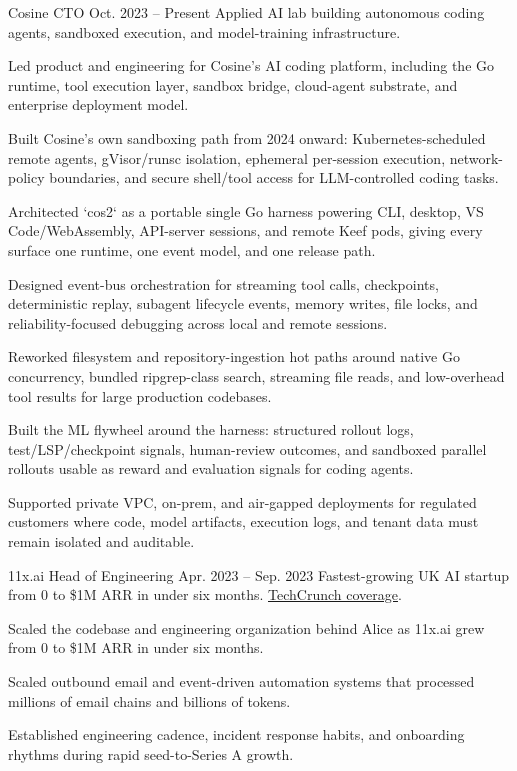 
\ResumeJob
  {Cosine}
  {CTO}
  {Oct. 2023 -- Present}
  {Applied AI lab building autonomous coding agents, sandboxed execution, and model-training infrastructure.}
\begin{ResumeList}
  \item Led product and engineering for Cosine's AI coding platform, including the Go runtime, tool execution layer, sandbox bridge, cloud-agent substrate, and enterprise deployment model.
  \item Built Cosine's own sandboxing path from 2024 onward: Kubernetes-scheduled remote agents, gVisor/runsc isolation, ephemeral per-session execution, network-policy boundaries, and secure shell/tool access for LLM-controlled coding tasks.
  \item Architected `cos2` as a portable single Go harness powering CLI, desktop, VS Code/WebAssembly, API-server sessions, and remote Keef pods, giving every surface one runtime, one event model, and one release path.
  \item Designed event-bus orchestration for streaming tool calls, checkpoints, deterministic replay, subagent lifecycle events, memory writes, file locks, and reliability-focused debugging across local and remote sessions.
  \item Reworked filesystem and repository-ingestion hot paths around native Go concurrency, bundled ripgrep-class search, streaming file reads, and low-overhead tool results for large production codebases.
  \item Built the ML flywheel around the harness: structured rollout logs, test/LSP/checkpoint signals, human-review outcomes, and sandboxed parallel rollouts usable as reward and evaluation signals for coding agents.
  \item Supported private VPC, on-prem, and air-gapped deployments for regulated customers where code, model artifacts, execution logs, and tenant data must remain isolated and auditable.
\end{ResumeList}

\ResumeJob
  {11x.ai}
  {Head of Engineering}
  {Apr. 2023 -- Sep. 2023}
  {Fastest-growing UK AI startup from 0 to \$1M ARR in under six months. \href{https://techcrunch.com/2023/08/11/11xai-closes-2-million-pre-seed-to-create-autonomous-ai-workers/}{TechCrunch coverage}.}
\begin{ResumeList}
  \item Scaled the codebase and engineering organization behind Alice as 11x.ai grew from 0 to \$1M ARR in under six months.
  \item Scaled outbound email and event-driven automation systems that processed millions of email chains and billions of tokens.
  \item Established engineering cadence, incident response habits, and onboarding rhythms during rapid seed-to-Series A growth.
\end{ResumeList}


